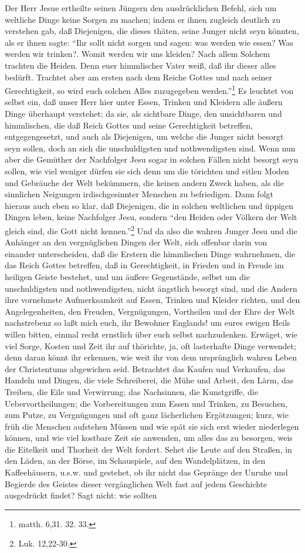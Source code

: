 Der Herr Jesue ertheilte seinen Jüngern den ausdrücklichen Befehl, sich um weltliche Dinge keine Sorgen zu machen; indem er ihnen zugleich deutlich zu verstehen gab, daß Diejenigen, die dieses thäten, seine Junger nicht seyn könnten, als er ihnen sagte: "`Ihr sollt nicht sorgen und sagen: was werden wie essen? Was werden wir trinken?. Womit werden wir uns kleiden? Nach allem Solchem trachten die Heiden. Denn euer himmlischer Vater weiß, daß ihr dieser alles bedürft. Trachtet aber am ersten nach dem Reiche Gottes und nach seiner Gerechtigkeit, so wird euch solchen Alles zuzugegeben werden."'\footnote{matth. 6,31. 32. 33.} Es leuchtet von selbst ein, daß unser Herr hier unter Essen, Trinken und Kleidern alle äußern Dinge überhaupt verstehet; da sie, als sichtbare Dinge, den unsichtbaren und himmlischen, die daß Reich Gottes und seine Gerechtigkeit betreffen, entgegengesetzt, und auch als Diejenigen, um welche die Junger nicht besorgt seyn sollen, doch an sich die unschuldigsten und nothwendigsten sind. Wenn nun aber die Gemüther der Nachfolger Jesu sogar in solchen Fällen nicht besorgt seyn sollen, wie viel weniger dürfen sie sich denn um die törichten und eitlen Moden und Gebräuche der Welt bekümmern, die keinen andern Zweck haben, als die sinnlichen Neigungen irdischgesinnter Menschen zu befriedigen. Dann folgt hieraus auch eben so klar, daß Diejenigen, die in solchen weltlichen und üppigen Dingen leben, keine Nachfolger Jesu, sondern "`den Heiden oder Völkern der Welt gleich sind, die Gott nicht kennen."'\footnote{Luk. 12,22-30.} Und da also die wahren Junger Jesu und die Anhänger an den vergnüglichen Dingen der Welt, sich offenbar darin von einander unterscheiden, daß die Erstern die himmlischen Dinge wahrnehmen, die das Reich Gottes betreffen, daß in Gerechtigkeit, in Frieden und in Freude im heiligen Geiste bestehet, und um äußere Gegenstände, selbst um die unschuldigsten und nothwendigsten, nicht ängstlich besorgt sind, und die Andern ihre vornehmste Aufmerksamkeit auf Essen, Trinken und Kleider richten, und den Angelegenheiten, den Freuden, Vergnügungen, Vortheilen und der Ehre der Welt nachstrebenz so laßt mich euch, ihr Bewohner Englands! um eures ewigen Heils willen bitten, einmal recht ernstlich über euch selbst nachzudenken. Erwäget, wie viel Sorge, Kosten und Zeit ihr auf thörichte, ja, oft lasterhafte Dinge verwendet; denn daran könnt ihr erkennen, wie weit ihr von dem ursprünglich wahren Leben der Christentums abgewichen seid. Betrachtet das Kaufen und Verkaufen, das Handeln und Dingen, die viele Schreiberei, die Mühe und Arbeit, den Lärm, das Treiben, die Eile und Verwirrung; das Nachsinnen, die Kunstgriffe, die Uebervortheilungen; die Vorbereitungen zum Essen und Trinken, zu Besuchen, zum Putze, zu Vergnügungen und oft ganz lächerlichen Ergötzungen; kurz, wie früh die Menschen aufstehen Müssen und wie spät sie sich erst wieder niederlegen können, und wie viel kostbare Zeit sie anwenden, um alles das zu besorgen, weis die Eitelkeit und Thorheit der Welt fordert. Sehet die Leute auf den Straßen, in den Läden, an der Börse, im Schauspiele, auf den Wandelplätzen, in den Kaffeehäusern, u.s.w. und gestehet, ob ihr nicht das Gepränge der Unruhe und Begierde des Geistes dieser vergänglichen Welt fast auf jedem Geschichte ausgedrückt findet? Sagt nicht: wie sollten 
